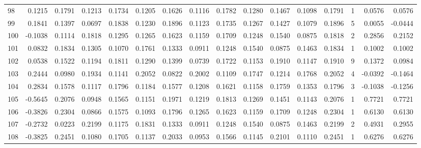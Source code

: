 \begin{tabular}{lrrrrrrrrrrrrrrr}
98  &      0.1215 &  0.1791 &  0.1213 &  0.1734 &  0.1205 &  0.1626 &  0.1116 &  0.1782 &  0.1280 &  0.1467 &   0.1098 &     0.1791 &      1 &                    0.0576 &                     0.0576 \\
99  &      0.1841 &  0.1397 &  0.0697 &  0.1838 &  0.1230 &  0.1896 &  0.1123 &  0.1735 &  0.1267 &  0.1427 &   0.1079 &     0.1896 &      5 &                    0.0055 &                    -0.0444 \\
100 &     -0.1038 &  0.1114 &  0.1818 &  0.1295 &  0.1265 &  0.1623 &  0.1159 &  0.1709 &  0.1248 &  0.1540 &   0.0875 &     0.1818 &      2 &                    0.2856 &                     0.2152 \\
101 &      0.0832 &  0.1834 &  0.1305 &  0.1070 &  0.1761 &  0.1333 &  0.0911 &  0.1248 &  0.1540 &  0.0875 &   0.1463 &     0.1834 &      1 &                    0.1002 &                     0.1002 \\
102 &      0.0538 &  0.1522 &  0.1194 &  0.1811 &  0.1290 &  0.1399 &  0.0739 &  0.1722 &  0.1153 &  0.1910 &   0.1147 &     0.1910 &      9 &                    0.1372 &                     0.0984 \\
103 &      0.2444 &  0.0980 &  0.1934 &  0.1141 &  0.2052 &  0.0822 &  0.2002 &  0.1109 &  0.1747 &  0.1214 &   0.1768 &     0.2052 &      4 &                   -0.0392 &                    -0.1464 \\
104 &      0.2834 &  0.1578 &  0.1117 &  0.1796 &  0.1184 &  0.1577 &  0.1208 &  0.1621 &  0.1158 &  0.1759 &   0.1353 &     0.1796 &      3 &                   -0.1038 &                    -0.1256 \\
105 &     -0.5645 &  0.2076 &  0.0948 &  0.1565 &  0.1151 &  0.1971 &  0.1219 &  0.1813 &  0.1269 &  0.1451 &   0.1143 &     0.2076 &      1 &                    0.7721 &                     0.7721 \\
106 &     -0.3826 &  0.2304 &  0.0866 &  0.1575 &  0.1093 &  0.1796 &  0.1265 &  0.1623 &  0.1159 &  0.1709 &   0.1248 &     0.2304 &      1 &                    0.6130 &                     0.6130 \\
107 &     -0.2732 &  0.0223 &  0.2199 &  0.1175 &  0.1831 &  0.1333 &  0.0911 &  0.1248 &  0.1540 &  0.0875 &   0.1463 &     0.2199 &      2 &                    0.4931 &                     0.2955 \\
108 &     -0.3825 &  0.2451 &  0.1080 &  0.1705 &  0.1137 &  0.2033 &  0.0953 &  0.1566 &  0.1145 &  0.2101 &   0.1110 &     0.2451 &      1 &                    0.6276 &                     0.6276 \\

\end{tabular}

